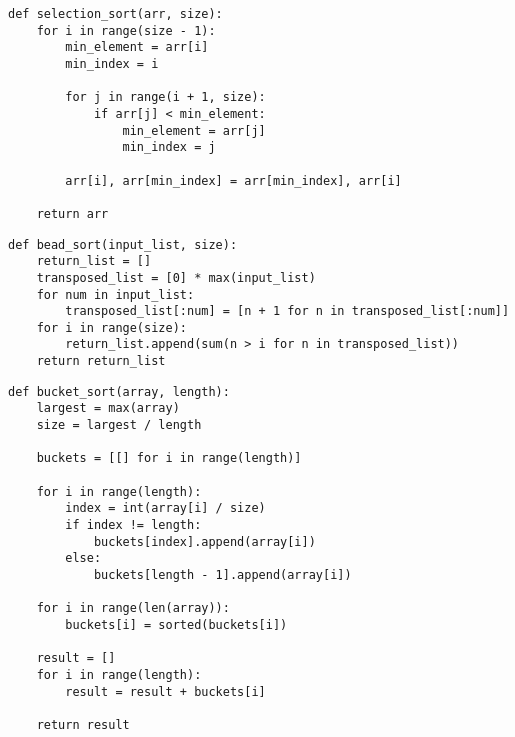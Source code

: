 \begin{center}
\captionsetup{justification=raggedright,singlelinecheck=off}
\begin{lstlisting}[label=lst:selection_sort,caption=Алгоритм сортировки выбором]
def selection_sort(arr, size):
    for i in range(size - 1):
        min_element = arr[i]
        min_index = i

        for j in range(i + 1, size):
            if arr[j] < min_element:
                min_element = arr[j]
                min_index = j
        
        arr[i], arr[min_index] = arr[min_index], arr[i]

	return arr
\end{lstlisting} 
\end{center}

\begin{center}
\captionsetup{justification=raggedright,singlelinecheck=off}
\begin{lstlisting}[label=lst:bead_sort,caption=Алгоритм сортировки бусинами]
def bead_sort(input_list, size):
	return_list = []
	transposed_list = [0] * max(input_list)
	for num in input_list:
		transposed_list[:num] = [n + 1 for n in transposed_list[:num]]
	for i in range(size):
		return_list.append(sum(n > i for n in transposed_list))
	return return_list

\end{lstlisting}
\end{center}

\clearpage

\begin{center}
\captionsetup{justification=raggedright,singlelinecheck=off}
\begin{lstlisting}[label=lst:bucket_sort,caption=Алгоритм блочной сортировки]
def bucket_sort(array, length):
	largest = max(array)
	size = largest / length

	buckets = [[] for i in range(length)]

	for i in range(length):
		index = int(array[i] / size)
		if index != length:
			buckets[index].append(array[i])
		else:
			buckets[length - 1].append(array[i])

	for i in range(len(array)):
		buckets[i] = sorted(buckets[i])

	result = []
	for i in range(length):
		result = result + buckets[i]

	return result
\end{lstlisting}
\end{center}

